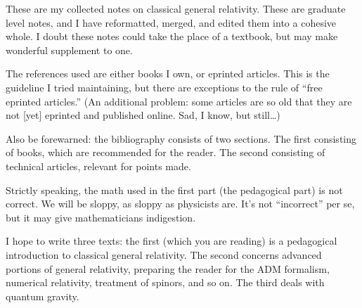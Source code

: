 \preface
These are my collected notes on classical general
relativity. These are graduate level notes, and I
have reformatted, merged, and edited them into a cohesive
whole. I doubt these notes could take the place of a textbook,
but may make wonderful supplement to one.

The references used are either books I own, or eprinted
articles. This is the guideline I tried maintaining, but there
are exceptions to the rule of ``free eprinted articles.'' (An
additional problem: some articles are so old that they are not
[yet] eprinted and published online. Sad, I know, but still\dots)

Also be forewarned: the bibliography consists of two
sections. The first consisting of books, which are recommended
for the reader. The second consisting of technical articles,
relevant for points made. 

Strictly speaking, the math used in the first part (the
pedagogical part) is not correct. We will be sloppy, as sloppy as
physicists are. It's not ``incorrect'' per se, but it may give
mathematicians indigestion.

I hope to write three texts: the first (which you are reading) is
a pedagogical introduction to classical general relativity. The
second concerns advanced portions of general relativity,
preparing the reader for the ADM formalism, numerical relativity,
treatment of spinors, and so on. The third deals with quantum gravity.
